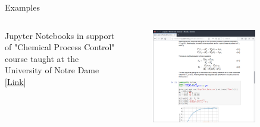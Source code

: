 \documentclass[11pt,t]{beamer}
\begin{document}
\begin{frame}[fragile]{Examples}  

	\begin{columns}[t]
		\begin{column}{.3\textwidth}
		Jupyter Notebooks in support of "Chemical Process Control" course taught at the University of Notre Dame [\href{http://jckantor.github.io/CBE30338/}{Link}]
	
 
		\end{column}
		\begin{column}{.7\textwidth}
			\vspace{-55pt}
			\begin{figure}
			\centering
			\includegraphics[width=0.80\textwidth]{jupyter_ex_chem}
			
			\end{figure}
		\end{column}
	\end{columns}	
		
\end{frame}
\end{document}
